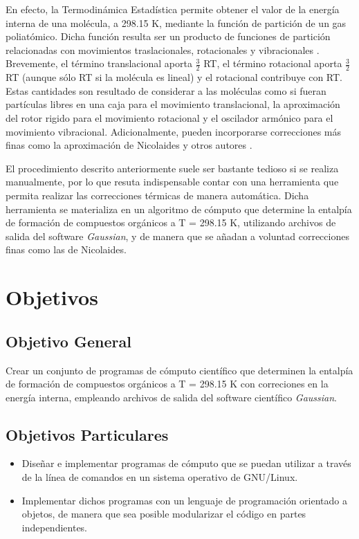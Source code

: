 \documentclass[12pt]{article}
\begin{document}
En efecto, la Termodinámica Estadística permite obtener el valor de la energía interna
de una molécula, a 298.15 K, mediante la función de partición de un gas poliatómico. Dicha
función resulta ser un producto de funciones de partición relacionadas con movimientos
traslacionales, rotacionales y vibracionales  \cite{McQuarrie1976, Nicolaides1996}.
Brevemente, el término translacional aporta $\frac{3}{2}$ RT, el término
rotacional aporta $\frac{3}{2}$ RT (aunque sólo RT si la molécula es lineal) y el rotacional
contribuye con RT. Estas cantidades son resultado de considerar a las moléculas como si
fueran partículas libres en una caja para el movimiento translacional, la aproximación del rotor
rigido para el movimiento rotacional y el oscilador armónico para el movimiento vibracional.
Adicionalmente, pueden incorporarse correcciones más finas como la aproximación de Nicolaides y otros autores  \cite{McQuarrie1976, Nicolaides1996}.

El procedimiento descrito anteriormente suele ser bastante tedioso si se realiza manualmente,
por lo que resuta indispensable contar con una herramienta que permita realizar
las correcciones térmicas de manera automática. Dicha herramienta se materializa en un
algoritmo de cómputo que determine la entalpía de formación de compuestos orgánicos
a T = 298.15 K, utilizando archivos de salida del software \textit{Gaussian}, y de manera que
se añadan a voluntad correcciones finas como las de Nicolaides.
 
\section*{Objetivos}

\subsection*{Objetivo General}

Crear un conjunto de programas de cómputo científico que determinen la entalpía de formación de compuestos orgánicos a T = 298.15 K con correciones en la energía interna, empleando archivos de salida del software científico \textit{Gaussian}.

\subsection*{Objetivos Particulares}
\begin{itemize}
\item Diseñar e implementar programas de cómputo que se puedan utilizar a través de la línea de comandos en un sistema operativo de GNU/Linux.

\item Implementar dichos programas con un lenguaje de programación orientado a objetos, de
manera que sea posible modularizar el código en partes independientes.
\end{itemize}
\end{document}
